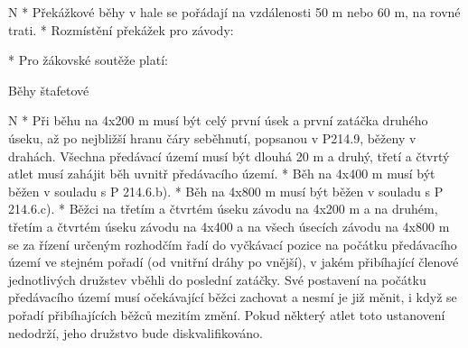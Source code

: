 \begitems \style N
* Překážkové běhy v hale se pořádají na vzdálenosti 50 m nebo 60 m, na rovné trati.
* Rozmístění překážek pro závody:


* Pro žákovské soutěže platí:

\enditems

\secc Běhy štafetové

\begitems \style N
* Při běhu na 4x200 m musí být celý první úsek a první zatáčka druhého úseku, až po nejbližší hranu čáry seběhnutí, popsanou v P214.9, běženy v drahách. Všechna předávací území musí být dlouhá 20 m a druhý, třetí a čtvrtý atlet musí zahájit běh uvnitř předávacího území.
* Běh na 4x400 m musí být běžen v souladu s P 214.6.b).
* Běh na 4x800 m musí být běžen v souladu s P 214.6.c).
* Běžci na třetím a čtvrtém úseku závodu na 4x200 m a na druhém, třetím a čtvrtém úseku závodu na 4x400 a na všech úsecích závodu na 4x800 m se za řízení určeným rozhodčím řadí do vyčkávací pozice na počátku předávacího území ve stejném pořadí (od vnitřní dráhy po vnější), v jakém přibíhající členové jednotlivých družstev vběhli do poslední zatáčky. Své postavení na počátku předávacího území musí očekávající běžci zachovat a nesmí je již měnit, i když se pořadí přibíhajících běžců mezitím změní. Pokud některý atlet toto ustanovení nedodrží, jeho družstvo bude diskvalifikováno.

